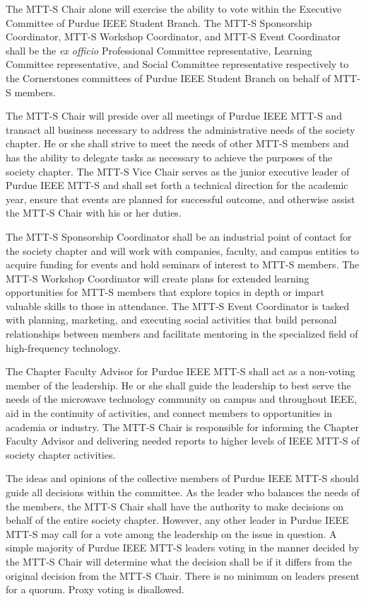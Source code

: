 \documentclass[12pt]{constitution}
\begin{document}
The MTT-S Chair alone will exercise the ability to vote within the Executive Committee of Purdue IEEE Student Branch. The MTT-S Sponsorship Coordinator, MTT-S Workshop Coordinator, and MTT-S Event Coordinator shall be the \textit{ex officio} Professional Committee representative, Learning Committee representative, and Social Committee representative respectively to the Cornerstones committees of Purdue IEEE Student Branch on behalf of MTT-S members.

The MTT-S Chair will preside over all meetings of Purdue IEEE MTT-S and transact all business necessary to address the administrative needs of the society chapter. He or she shall strive to meet the needs of other MTT-S members and has the ability to delegate tasks as necessary to achieve the purposes of the society chapter. The MTT-S Vice Chair serves as the junior executive leader of Purdue IEEE MTT-S and shall set forth a technical direction for the academic year, ensure that events are planned for successful outcome, and otherwise assist the MTT-S Chair with his or her duties.

The MTT-S Sponsorship Coordinator shall be an industrial point of contact for the society chapter and will work with companies, faculty, and campus entities to acquire funding for events and hold seminars of interest to MTT-S members. The MTT-S Workshop Coordinator will create plans for extended learning opportunities for MTT-S members that explore topics in depth or impart valuable skills to those in attendance. The MTT-S Event Coordinator is tasked with planning, marketing, and executing social activities that build personal relationships between members and facilitate mentoring in the specialized field of high-frequency technology.

The Chapter Faculty Advisor for Purdue IEEE MTT-S shall act as a non-voting member of the leadership. He or she shall guide the leadership to best serve the needs of the microwave technology community on campus and throughout IEEE, aid in the continuity of activities, and connect members to opportunities in academia or industry. The MTT-S Chair is responsible for informing the Chapter Faculty Advisor and delivering needed reports to higher levels of IEEE MTT-S of society chapter activities.


\label{art:decide}

The ideas and opinions of the collective members of Purdue IEEE MTT-S should guide all decisions within the committee. As the leader who balances the needs of the members, the MTT-S Chair shall have the authority to make decisions on behalf of the entire society chapter. However, any other leader in Purdue IEEE MTT-S may call for a vote among the leadership on the issue in question. A simple majority of Purdue IEEE MTT-S leaders voting in the manner decided by the MTT-S Chair will determine what the decision shall be if it differs from the original decision from the MTT-S Chair. There is no minimum on leaders present for a quorum. Proxy voting is disallowed.
\end{document}
